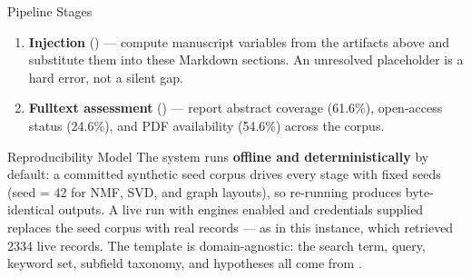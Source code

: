 \documentclass[
  ignorenonframetext,
]{beamer}
\begin{document}
\begin{frame}{Pipeline Stages}
\begin{enumerate}
  \textbf{Figures} () --- render 21
  publication-ready visualizations from the analysis JSON outputs. All
  figures use a colourblind-safe palette (Wong 2011), high-contrast
  labels at \(\geq 16\)pt, and a headless matplotlib backend (Agg).
\item
  \textbf{Injection} () --- compute
  manuscript variables from the artifacts above and substitute them into
  these Markdown sections. An unresolved placeholder is a hard error,
  not a silent gap.
\item
  \textbf{Fulltext assessment} ()
  --- report abstract coverage (61.6\%), open-access status (24.6\%),
  and PDF availability (54.6\%) across the corpus.
\end{enumerate}
\end{frame}

\begin{frame}{Reproducibility Model}
\protect{}\label{reproducibility-model}
The system runs \textbf{offline and deterministically} by default: a
committed synthetic seed corpus drives every stage with fixed seeds
(seed = 42 for NMF, SVD, and graph layouts), so re-running produces
byte-identical outputs. A live run with engines enabled and credentials
supplied replaces the seed corpus with real records --- as in this
instance, which retrieved 2334 live records. The template is
domain-agnostic: the search term, query, keyword set, subfield taxonomy,
and hypotheses all come from .
\end{frame}
\end{document}
